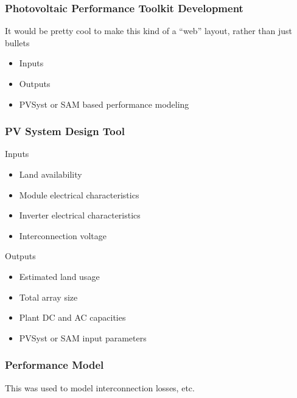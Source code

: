 \documentclass[aspectratio=169]{beamer}
\begin{document}
\begin{frame}
  \frametitle{Photovoltaic Performance Toolkit Development}
  It would be pretty cool to make this kind of a ``web'' layout, rather than just bullets
  \begin{itemize}
  \item Inputs
  \item Outputs
  \item PVSyst or SAM based performance modeling
  \end{itemize}
\end{frame}

\begin{frame}
  \frametitle{PV System Design Tool}
  \begin{block}{Inputs}
    \begin{itemize}
      \item Land availability
      \item Module electrical characteristics
      \item Inverter electrical characteristics
      \item Interconnection voltage
    \end{itemize}
  \end{block}

  \begin{block}{Outputs}
    \begin{itemize}
    \item Estimated land usage
    \item Total array size
    \item Plant DC and AC capacities
      \item PVSyst or SAM input parameters
    \end{itemize}
  \end{block}
\end{frame}

\begin{frame}
  \frametitle{Performance Model}
  This was used to model interconnection losses, etc.

\end{frame}
\end{document}

